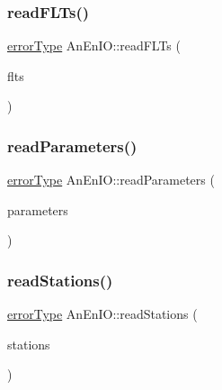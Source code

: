 \mbox{\label{class_an_en_i_o_a7fdb924e4990c113e2e897310f9ce57c}} 
\subsubsection{\texorpdfstring{read\+F\+L\+Ts()}{readFLTs()}}
{\footnotesize\ttfamily \mbox{\hyperlink{class_an_en_i_o_aa56bc1ec6610b86db4349bce20f9ead0}{error\+Type}} An\+En\+I\+O\+::read\+F\+L\+Ts (\begin{DoxyParamCaption}\item[{\mbox{\hyperlink{class_f_l_ts}{F\+L\+Ts}} \&}]{flts }\end{DoxyParamCaption})}

\mbox{\label{class_an_en_i_o_a909adad6126ab91d304d8bcc46bd5783}} 
\subsubsection{\texorpdfstring{read\+Parameters()}{readParameters()}}
{\footnotesize\ttfamily \mbox{\hyperlink{class_an_en_i_o_aa56bc1ec6610b86db4349bce20f9ead0}{error\+Type}} An\+En\+I\+O\+::read\+Parameters (\begin{DoxyParamCaption}\item[{\mbox{\hyperlink{class_parameters}{Parameters}} \&}]{parameters }\end{DoxyParamCaption})}

\mbox{\label{class_an_en_i_o_a39c40b1ffcd5b12fc8991a0c47346f00}} 
\subsubsection{\texorpdfstring{read\+Stations()}{readStations()}}
{\footnotesize\ttfamily \mbox{\hyperlink{class_an_en_i_o_aa56bc1ec6610b86db4349bce20f9ead0}{error\+Type}} An\+En\+I\+O\+::read\+Stations (\begin{DoxyParamCaption}\item[{\mbox{\hyperlink{class_stations}{Stations}} \&}]{stations }\end{DoxyParamCaption})}

